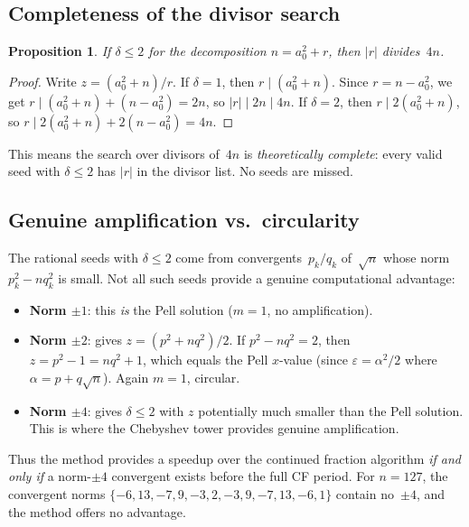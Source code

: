 \documentclass[11pt]{article}
\newtheorem{proposition}[theorem]{Proposition}
\theoremstyle{definition}
\theoremstyle{remark}
\begin{document}
\subsection{Completeness of the divisor search}

\begin{proposition}\label{prop:complete}
If $\delta \le 2$ for the decomposition $n = a_0^2 + r$, then
$|r|$ divides~$4n$.
\end{proposition}

\begin{proof}
Write $z = (a_0^2 + n)/r$.  If $\delta = 1$, then $r \mid (a_0^2 + n)$.
Since $r = n - a_0^2$, we get $r \mid (a_0^2 + n) + (n - a_0^2) = 2n$,
so $|r| \mid 2n \mid 4n$.
If $\delta = 2$, then $r \mid 2(a_0^2 + n)$, so
$r \mid 2(a_0^2 + n) + 2(n - a_0^2) = 4n$.
\end{proof}

This means the search over divisors of~$4n$ is \emph{theoretically complete}:
every valid seed with $\delta \le 2$ has $|r|$ in the divisor list.
No seeds are missed.

\subsection{Genuine amplification vs.\ circularity}

The rational seeds with $\delta \le 2$ come from convergents~$p_k/q_k$
of~$\sqrt{n}$ whose norm $p_k^2 - nq_k^2$ is small.
Not all such seeds provide a genuine computational advantage:

\begin{itemize}
\item \textbf{Norm $\pm 1$}: this \emph{is} the Pell solution
  ($m = 1$, no amplification).
\item \textbf{Norm $\pm 2$}: gives $z = (p^2 + nq^2)/2$.
  If $p^2 - nq^2 = 2$, then $z = p^2 - 1 = nq^2 + 1$,
  which equals the Pell $x$-value (since
  $\varepsilon = \alpha^2/2$ where $\alpha = p + q\sqrt{n}$).
  Again $m = 1$, circular.
\item \textbf{Norm $\pm 4$}: gives $\delta \le 2$ with $z$ potentially
  much smaller than the Pell solution.
  This is where the Chebyshev tower provides genuine amplification.
\end{itemize}

Thus the method provides a speedup over the continued fraction algorithm
\emph{if and only if} a norm-$\pm 4$ convergent exists before the
full CF period.  For $n = 127$, the convergent norms
$\{-6, 13, -7, 9, -3, 2, -3, 9, -7, 13, -6, 1\}$
contain no~$\pm 4$, and the method offers no advantage.
\end{document}
